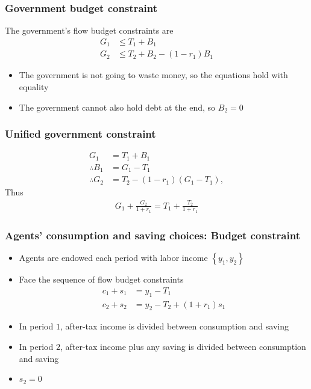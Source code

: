 \documentclass[presentation,dvipsnames]{beamer}
\begin{document}
\begin{frame}
\frametitle{Government budget constraint}
The government's flow budget constraints are
\begin{align*}
G_{1} &\leq T_{1} + B_{1} \\
G_{2} &\leq T_{2} + B_{2} - (1-r_{1})B_{1}
\end{align*}
\begin{itemize}[label={--}]
\item The government is not going to waste money, so the equations hold with equality
\item The government cannot also hold debt at the end, so $B_{2} = 0$
\end{itemize}
\end{frame}

\begin{frame}
\frametitle{Unified government constraint}
\begin{align*}
G_{1} &= T_{1} + B_{1} \\
\therefore B_{1} &= G_{1} - T_{1} \\
\therefore G_{2} &= T_{2} - (1-r_{1}) \left( G_{1} - T_{1} \right),
\end{align*}
Thus
\begin{align*}
G_{1} + \frac{G_{2}}{1+r_{1}} = T_{1} + \frac{T_{2}}{1+r_{1}}
\end{align*}
\end{frame}

\begin{frame}
\frametitle{Agents' consumption and saving choices: Budget constraint}
\begin{itemize}[label={--}]
\item Agents are endowed each period with labor income $\left\{ y_{1},y_{2} \right\}$
\item Face the sequence of flow budget constraints
\begin{align*}
c_{1} + s_{1} &= y_{1} - T_{1} \\
c_{2} + s_{2} &= y_{2} - T_{2} + (1+r_{1})s_{1}
\end{align*}
\item In period $1$, after-tax income is divided between consumption and saving
\item In period $2$, after-tax income plus any saving is divided between consumption and saving
\item $s_{2} = 0$
\end{itemize}
\end{frame}
\end{document}
